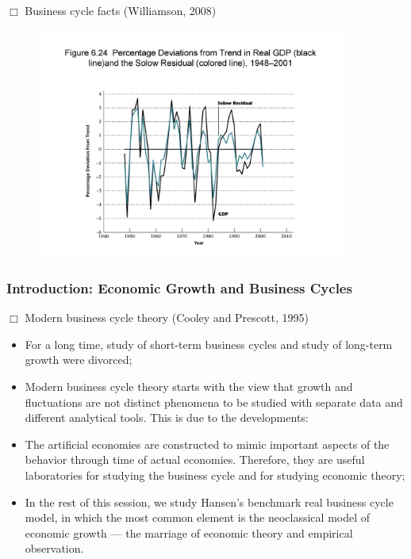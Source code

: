 \documentclass[handout]{beamer}
\begin{document}
\begin{frame}
{\scriptsize{$\Box$ Business cycle facts (Williamson, 2008)}}
\begin{figure}
\centering
\includegraphics[width = 4.0in]{Fig6_11.jpg}
\end{figure}
\end{frame}



\begin{frame}

\frametitle{Introduction: Economic Growth and Business Cycles}

{\small{

$\Box$ Modern business cycle theory (Cooley and Prescott, 1995)
\begin{itemize}
\item For a long time, study of short-term business cycles and study
of long-term growth were divorced;
\item Modern business cycle theory starts with the view that growth
and fluctuations are not distinct phenomena to be studied with
separate data and different analytical tools. This is due to the
developments:
\item The artificial economies are constructed to mimic important
aspects of the behavior through time of actual economies. Therefore,
they are useful laboratories for studying the business cycle and for
studying economic theory;
\item In the rest of this session, we study Hansen's benchmark
real business cycle model, in which the most common element is the
neoclassical model of economic growth --- the marriage of economic
theory and empirical observation.
\end{itemize}
}}
\end{frame}
\end{document}
